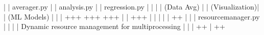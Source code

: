 \documentclass[a4paper,11pt,english,openany,oneside]{sphinxmanual}
\begin{document}
\begin{sphinxVerbatim}[commandchars=\\\{\}]
|  |   averager.py  |  |  analysis.py   |  | regression.py |  |
|  | (Data Avg)     |  | (Visualization)|  | (ML Models)   |  |
|  +\PYGZhy{}\PYGZhy{}\PYGZhy{}\PYGZhy{}\PYGZhy{}\PYGZhy{}\PYGZhy{}+\PYGZhy{}\PYGZhy{}\PYGZhy{}\PYGZhy{}\PYGZhy{}\PYGZhy{}\PYGZhy{}\PYGZhy{}+  +\PYGZhy{}\PYGZhy{}\PYGZhy{}\PYGZhy{}\PYGZhy{}\PYGZhy{}\PYGZhy{}+\PYGZhy{}\PYGZhy{}\PYGZhy{}\PYGZhy{}\PYGZhy{}\PYGZhy{}\PYGZhy{}\PYGZhy{}+  +\PYGZhy{}\PYGZhy{}\PYGZhy{}\PYGZhy{}\PYGZhy{}\PYGZhy{}+\PYGZhy{}\PYGZhy{}\PYGZhy{}\PYGZhy{}\PYGZhy{}\PYGZhy{}\PYGZhy{}\PYGZhy{}+  |
|          +\PYGZhy{}\PYGZhy{}\PYGZhy{}\PYGZhy{}\PYGZhy{}\PYGZhy{}\PYGZhy{}\PYGZhy{}\PYGZhy{}\PYGZhy{}\PYGZhy{}\PYGZhy{}\PYGZhy{}\PYGZhy{}\PYGZhy{}\PYGZhy{}\PYGZhy{}\PYGZhy{}\PYGZhy{}+\PYGZhy{}\PYGZhy{}\PYGZhy{}\PYGZhy{}\PYGZhy{}\PYGZhy{}\PYGZhy{}\PYGZhy{}\PYGZhy{}\PYGZhy{}\PYGZhy{}\PYGZhy{}\PYGZhy{}\PYGZhy{}\PYGZhy{}\PYGZhy{}\PYGZhy{}\PYGZhy{}\PYGZhy{}+          |
|                              |                              |
|  +\PYGZhy{}\PYGZhy{}\PYGZhy{}\PYGZhy{}\PYGZhy{}\PYGZhy{}\PYGZhy{}\PYGZhy{}\PYGZhy{}\PYGZhy{}\PYGZhy{}\PYGZhy{}\PYGZhy{}\PYGZhy{}\PYGZhy{}\PYGZhy{}\PYGZhy{}\PYGZhy{}\PYGZhy{}\PYGZhy{}\PYGZhy{}\PYGZhy{}\PYGZhy{}\PYGZhy{}\PYGZhy{}\PYGZhy{}\PYGZhy{}\PYGZhy{}\PYGZhy{}\PYGZhy{}\PYGZhy{}\PYGZhy{}\PYGZhy{}\PYGZhy{}\PYGZhy{}\PYGZhy{}\PYGZhy{}\PYGZhy{}\PYGZhy{}\PYGZhy{}\PYGZhy{}\PYGZhy{}\PYGZhy{}\PYGZhy{}\PYGZhy{}\PYGZhy{}\PYGZhy{}\PYGZhy{}\PYGZhy{}\PYGZhy{}\PYGZhy{}\PYGZhy{}\PYGZhy{}\PYGZhy{}\PYGZhy{}+  |
|  |              resource\PYGZus{}manager.py                      |  |
|  |   Dynamic resource management for multiprocessing   |  |
|  +\PYGZhy{}\PYGZhy{}\PYGZhy{}\PYGZhy{}\PYGZhy{}\PYGZhy{}\PYGZhy{}\PYGZhy{}\PYGZhy{}\PYGZhy{}\PYGZhy{}\PYGZhy{}\PYGZhy{}\PYGZhy{}\PYGZhy{}\PYGZhy{}\PYGZhy{}\PYGZhy{}\PYGZhy{}\PYGZhy{}\PYGZhy{}\PYGZhy{}\PYGZhy{}\PYGZhy{}\PYGZhy{}\PYGZhy{}\PYGZhy{}\PYGZhy{}\PYGZhy{}\PYGZhy{}\PYGZhy{}\PYGZhy{}\PYGZhy{}\PYGZhy{}\PYGZhy{}\PYGZhy{}\PYGZhy{}\PYGZhy{}\PYGZhy{}\PYGZhy{}\PYGZhy{}\PYGZhy{}\PYGZhy{}\PYGZhy{}\PYGZhy{}\PYGZhy{}\PYGZhy{}\PYGZhy{}\PYGZhy{}\PYGZhy{}\PYGZhy{}\PYGZhy{}\PYGZhy{}\PYGZhy{}\PYGZhy{}+  |
+\PYGZhy{}\PYGZhy{}\PYGZhy{}\PYGZhy{}\PYGZhy{}\PYGZhy{}\PYGZhy{}\PYGZhy{}\PYGZhy{}\PYGZhy{}\PYGZhy{}\PYGZhy{}\PYGZhy{}\PYGZhy{}\PYGZhy{}\PYGZhy{}\PYGZhy{}\PYGZhy{}\PYGZhy{}\PYGZhy{}\PYGZhy{}\PYGZhy{}\PYGZhy{}\PYGZhy{}\PYGZhy{}\PYGZhy{}\PYGZhy{}\PYGZhy{}\PYGZhy{}\PYGZhy{}\PYGZhy{}\PYGZhy{}\PYGZhy{}\PYGZhy{}\PYGZhy{}\PYGZhy{}\PYGZhy{}\PYGZhy{}\PYGZhy{}\PYGZhy{}\PYGZhy{}\PYGZhy{}\PYGZhy{}\PYGZhy{}\PYGZhy{}\PYGZhy{}\PYGZhy{}\PYGZhy{}\PYGZhy{}\PYGZhy{}\PYGZhy{}\PYGZhy{}\PYGZhy{}\PYGZhy{}\PYGZhy{}\PYGZhy{}\PYGZhy{}\PYGZhy{}\PYGZhy{}\PYGZhy{}\PYGZhy{}+

\end{sphinxVerbatim}
\end{document}
